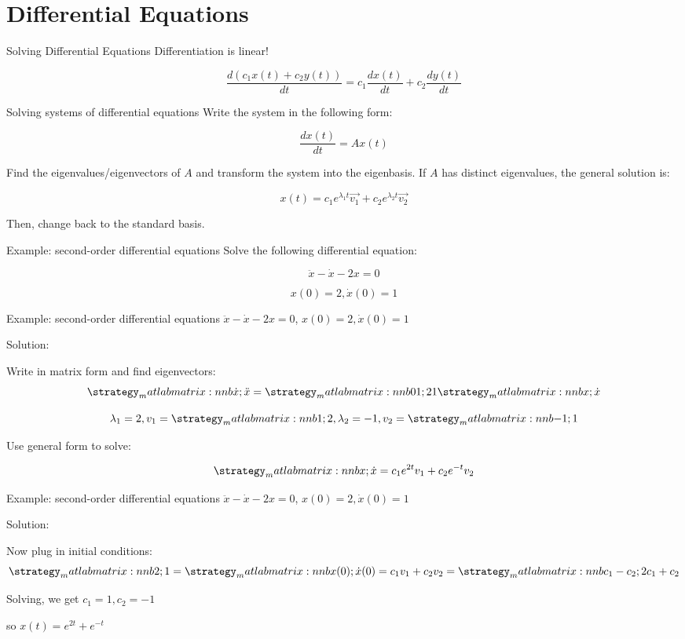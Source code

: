 \section{Differential Equations}
    \begin{frame}{Solving Differential Equations}
	    Differentiation is linear!
	    
	    $$\frac{d(c_1x(t) + c_2y(t))}{dt} = c_1\frac{dx(t)}{dt} + c_2\frac{dy(t)}{dt}$$
	\end{frame}
	
	\begin{frame}{Solving systems of differential equations}
	    Write the system in the following form:

        $$\frac{dx(t)}{dt} = Ax(t)$$
        
        Find the eigenvalues/eigenvectors of $A$ and transform the system into the eigenbasis. If $A$ has distinct eigenvalues, the general solution is:
        
        $$x(t) = c_1e^{\lambda_1{t}}\vec{v_1} + c_2e^{\lambda_2{t}}\vec{v_2}$$
        
        Then, change back to the standard basis.
	\end{frame}
	
	\begin{frame}{Example: second-order differential equations}
	    Solve the following differential equation:

        $$\ddot{x} - \dot{x} - 2x = 0$$
        
        $$x(0) = 2, \dot{x}(0) = 1$$
	\end{frame}
	
	\begin{frame}{Example: second-order differential equations}
	    $\ddot{x} - \dot{x} - 2x = 0$, $x(0) = 2, \dot{x}(0) = 1$
	    
	    Solution:
	    
	    Write in matrix form and find eigenvectors:
	    $$\mat{\dot{x};\ddot{x}} = \mat{0 1; 2 1}\mat{x;\dot{x}}$$
	    
	    $$\lambda_1 = 2, v_1 = \mat{1;2}, \lambda_2 = -1, v_2 = \mat{-1;1}$$
	    
	    Use general form to solve:
	    
	    $$\mat{x;\dot{x}} = c_1e^{2t}v_1 + c_2e^{-t}v_2$$
	\end{frame}
	
	\begin{frame}{Example: second-order differential equations}
	    $\ddot{x} - \dot{x} - 2x = 0$, $x(0) = 2, \dot{x}(0) = 1$
	    
	    Solution:
	    
	    Now plug in initial conditions:
	    $$\mat{2;1} = \mat{x(0); \dot{x}(0)} = c_1v_1 + c_2v_2 = \mat{c_1-c_2;2c_1+c_2}$$
	    
	    Solving, we get $c_1 = 1, c_2 = -1$
	    
	    so $x(t) = e^{2t} + e^{-t}$
	\end{frame}
	
